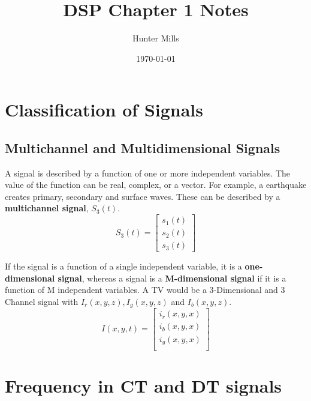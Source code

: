 \documentclass{article} %
\title{DSP Chapter 1 Notes} %
\author{Hunter Mills} %
\date{\today} %
\begin{document}
    \maketitle %
    
    \section{Classification of Signals} %
    
    \subsection{Multichannel and Multidimensional Signals}
    
    A signal is described by a function of one or more independent variables. The value of the function can be real, complex, or a vector. For example,
    a earthquake creates primary, secondary and surface waves. These can be described by a \textbf{multichannel signal}, $S_3(t)$.
    \begin{equation}  
	S_3(t) = \begin{bmatrix}
			s_{1}(t) \\
			s_{2}(t) \\
			s_{3}(t)
			\end{bmatrix}  
    \end{equation}
    
    If the signal is a function of a single independent variable, it is a \textbf{one-dimensional signal}, whereas a signal is a \textbf{M-dimensional signal} if
    it is a function of M independent variables. A TV would be a 3-Dimensional and 3 Channel signal with $I_r(x,y,z), I_g(x,y,z)$ and $I_b(x,y,z)$.
    \begin{equation}  
	I(x, y, t) = \begin{bmatrix}
			i_{r}(x,y,x) \\
			i_{b}(x,y,x) \\
			i_{g}(x,y,x) \\
			\end{bmatrix} 
    \end{equation}
    
    \section{Frequency in CT and DT signals}
\end{document}
